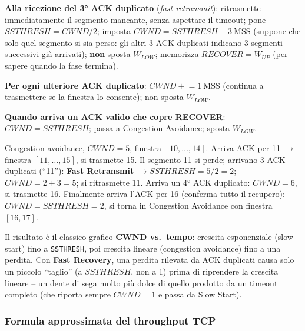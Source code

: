 \documentclass[12pt, a4paper]{article}
\begin{document}
\begin{tcolorbox}[colback=lightergray!10, colframe=tocsec, title=\textbf{Algoritmo -- Fast Retransmit e Fast Recovery}]
\textbf{Alla ricezione del 3° ACK duplicato} (\textit{fast retransmit}): ritrasmette immediatamente il segmento mancante, senza aspettare il timeout; pone $SSTHRESH=CWND/2$; imposta $CWND=SSTHRESH+3\ \text{MSS}$ (suppone che solo quel segmento si sia perso: gli altri 3 ACK duplicati indicano 3 segmenti successivi già arrivati); \textbf{non} sposta $W_{LOW}$; memorizza $RECOVER=W_{UP}$ (per sapere quando la fase termina).

\textbf{Per ogni ulteriore ACK duplicato}: $CWND \mathrel{+}= 1\ \text{MSS}$ (continua a trasmettere se la finestra lo consente); non sposta $W_{LOW}$.

\textbf{Quando arriva un ACK valido che copre RECOVER}: $CWND=SSTHRESH$; passa a Congestion Avoidance; sposta $W_{LOW}$.
\end{tcolorbox}

\begin{tcolorbox}[colback=lightergray!10, colframe=tocsec, title=\textbf{Esempio numerico}]
Congestion avoidance, $CWND=5$, finestra $[10,\dots,14]$. Arriva ACK per 11 $\to$ finestra $[11,\dots,15]$, si trasmette 15. Il segmento 11 si perde; arrivano 3 ACK duplicati (``11''): \textbf{Fast Retransmit} $\to SSTHRESH=5/2=2$; $CWND=2+3=5$; si ritrasmette 11. Arriva un 4° ACK duplicato: $CWND=6$, si trasmette 16. Finalmente arriva l'ACK per 16 (conferma tutto il recupero): $CWND=SSTHRESH=2$, si torna in Congestion Avoidance con finestra $[16,17]$.
\end{tcolorbox}

Il risultato è il classico grafico \textbf{CWND vs.\ tempo}: crescita esponenziale (slow start) fino a \texttt{SSTHRESH}, poi crescita lineare (congestion avoidance) fino a una perdita. Con \textbf{Fast Recovery}, una perdita rilevata da ACK duplicati causa solo un piccolo ``taglio'' (a $SSTHRESH$, non a 1) prima di riprendere la crescita lineare -- un dente di sega molto più dolce di quello prodotto da un timeout completo (che riporta sempre $CWND=1$ e passa da Slow Start).

\subsubsection{Formula approssimata del throughput TCP}
\end{document}
